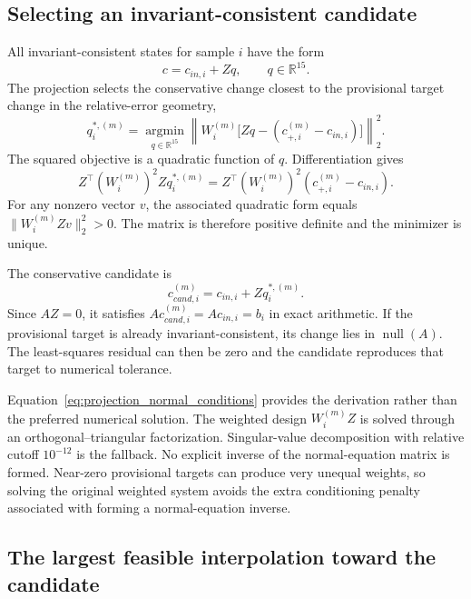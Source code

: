\subsection{Selecting an invariant-consistent candidate}

All invariant-consistent states for sample $i$ have the form
\begin{equation}
c=c_{in,i}+Zq,\qquad q\in\mathbb{R}^{15}.
\label{eq:projection_affine_parameterization}
\end{equation}
The projection selects the conservative change closest to the provisional target change in the relative-error geometry,
\begin{equation}
q_i^{*,(m)}=\underset{q\in\mathbb{R}^{15}}{\operatorname{argmin}}
\left\|W_i^{(m)}\bigl[Zq-(c_{+,i}^{(m)}-c_{in,i})\bigr]\right\|_2^2.
\label{eq:projection_weighted_least_squares}
\end{equation}
The squared objective is a quadratic function of $q$. Differentiation gives
\begin{equation}
Z^\top(W_i^{(m)})^2Zq_i^{*,(m)}
=Z^\top(W_i^{(m)})^2(c_{+,i}^{(m)}-c_{in,i}).
\label{eq:projection_normal_conditions}
\end{equation}
For any nonzero vector $v$, the associated quadratic form equals $\|W_i^{(m)}Zv\|_2^2>0$. The matrix is therefore positive definite and the minimizer is unique.

The conservative candidate is
\begin{equation}
c_{cand,i}^{(m)}=c_{in,i}+Zq_i^{*,(m)}.
\label{eq:projection_conservative_candidate}
\end{equation}
Since $AZ=0$, it satisfies $Ac_{cand,i}^{(m)}=Ac_{in,i}=b_i$ in exact arithmetic. If the provisional target is already invariant-consistent, its change lies in $\operatorname{null}(A)$. The least-squares residual can then be zero and the candidate reproduces that target to numerical tolerance.

Equation~\eqref{eq:projection_normal_conditions} provides the derivation rather than the preferred numerical solution. The weighted design $W_i^{(m)}Z$ is solved through an orthogonal--triangular factorization. Singular-value decomposition with relative cutoff $10^{-12}$ is the fallback. No explicit inverse of the normal-equation matrix is formed. Near-zero provisional targets can produce very unequal weights, so solving the original weighted system avoids the extra conditioning penalty associated with forming a normal-equation inverse.

\subsection{The largest feasible interpolation toward the candidate}

